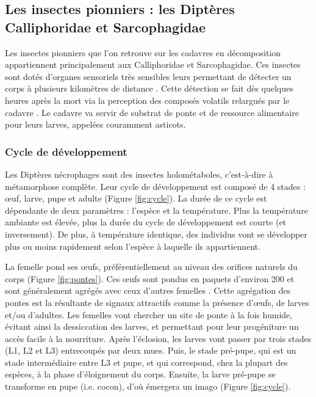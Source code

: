 
    \subsection{Les insectes pionniers : les Diptères Calliphoridae et Sarcophagidae}
Les insectes pionniers que l'on retrouve sur les cadavres en décomposition appartiennent principalement aux Calliphoridae et Sarcophagidae. Ces insectes sont dotés d'organes sensoriels très sensibles leurs permettant de détecter un corps à plusieurs kilomètres de distance \cite{barton_browne_role_1960}. Cette détection se fait dès quelques heures après la mort via la perception des composés volatils relargués par le cadavre \cite{frederickx_responses_2012}. Le cadavre va servir de substrat de ponte et de ressource alimentaire pour leurs larves, appelées couramment asticots.

		\subsubsection{Cycle de développement}
Les Diptères nécrophages sont des insectes holométaboles, c'est-à-dire à métamorphose complète. Leur cycle de développement est composé de 4 stades : œuf, larve, pupe et adulte (Figure \ref{fig:cycle}). La durée de ce cycle est dépendante de deux paramètres : l'espèce et la température. Plus la température ambiante est élevée, plus la durée du cycle de développement est courte (et inversement). De plus, à température identique, des individus vont se développer plus ou moins rapidement selon l'espèce à laquelle ils appartiennent.

La femelle pond ses œufs, préférentiellement au niveau des orifices naturels du corps (Figure \ref{fig:pontes}). Ces œufs sont pondus en paquets d'environ 200 et sont généralement agrégés avec ceux d'autres femelles \citep{fenton_oviposition_1999, brodie_is_2014}. Cette agrégation des pontes est la résultante de signaux attractifs comme la présence d'œufs, de larves et/ou d'adultes. Les femelles vont chercher un site de ponte à la fois humide, évitant ainsi la dessiccation des larves, et permettant pour leur progéniture un accès facile à la nourriture.
Après l'éclosion, les larves vont passer par trois stades (L1, L2 et L3) entrecoupés par deux mues. Puis, le stade pré-pupe, qui est un stade intermédiaire entre L3 et pupe, et qui correspond, chez la plupart des espèces, à la phase d'éloignement du corps. Ensuite, la larve pré-pupe se transforme en pupe (i.e. cocon), d'où émergera un imago (Figure \ref{fig:cycle}).   

